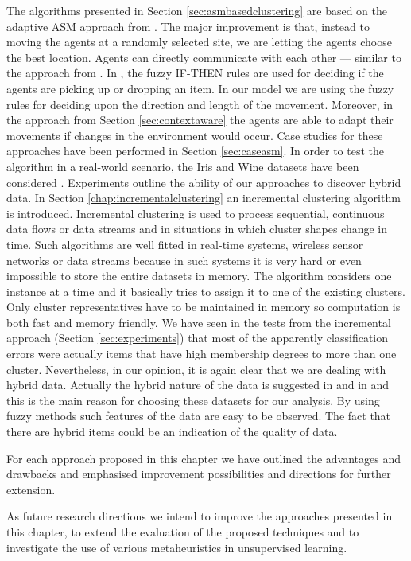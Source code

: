 The algorithms presented in Section \ref{sec:asmbasedclustering} are based on the adaptive ASM approach from \cite{Chen04AnAdaptive}. The major improvement is that, instead to moving the agents at a randomly selected site, we are letting the agents choose the best location. Agents can directly communicate with each other --- similar to the approach from \cite{Chira07Stigmergic}. In \cite{Schockaert04Fuzzy}, the fuzzy IF-THEN rules are used for deciding if the agents are picking up or dropping an item. In our model we are using the fuzzy rules for deciding upon the direction and length of the movement. Moreover, in the approach from Section \ref{sec:contextaware} the agents are able to adapt their movements if changes in the environment would occur. Case studies for these approaches have been performed in Section \ref{sec:caseasm}. In order to test the algorithm in a real-world scenario, the Iris and Wine datasets have been considered \cite{website:iris, website:wine}. Experiments outline the ability of our approaches to discover hybrid data. 
In Section \ref{chap:incrementalclustering} an incremental clustering algorithm is introduced. Incremental clustering is used to process sequential, continuous data flows or data streams and in situations in which cluster shapes change in time. Such algorithms are well fitted in real-time systems, wireless sensor networks or data streams because in such systems it is very hard or even impossible to store the entire datasets in memory. The algorithm considers one instance at a time and it basically tries to assign it to one of the existing clusters. Only cluster representatives have to be maintained in memory so computation is both fast and memory friendly. 
We have seen in the tests from the incremental approach (Section \ref{sec:experiments}) that most of the apparently classification errors were actually items that have high membership degrees to more than one cluster. Nevertheless, in our opinion, it is again clear that we are dealing with hybrid data. Actually the hybrid nature of the data is suggested in \cite{website:iris} and in \cite{website:wine} and this is the main reason for choosing these datasets for our analysis. By using fuzzy methods such features of the data are easy to be observed. The fact that there are hybrid items could be an indication of the quality of data.

For each approach proposed in this chapter we have outlined the advantages and drawbacks and emphasised improvement possibilities and directions for further extension. 

As future research directions we intend to improve the approaches presented in this chapter, to extend the evaluation of the proposed techniques and to investigate the use of various metaheuristics in unsupervised learning.





